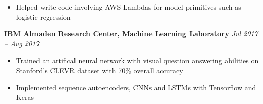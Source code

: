 \documentclass{res}
\begin{document}
\begin{resume}
\begin{itemize}
mization for Cirrus, a serverless machine learning framework
            \item Helped write code involving AWS Lambdas for model primitives such as logistic regression
        \end{itemize}
		\vspace{-10pt}
		{\bf IBM Almaden Research Center, Machine Learning Laboratory} \hfill \emph{Jul 2017 -- Aug 2017} \\
        \vspace{-10pt}
        \begin{itemize}
            \item Trained an artifical neural network with visual question answering abilities on Stanford’s CLEVR
dataset with 70\% overall accuracy
            \item Implemented sequence autoencoders, CNNs and LSTMs with Tensorflow and Keras
        \end{itemize}
		\vspace{-10pt}

\end{resume}
\end{document}
